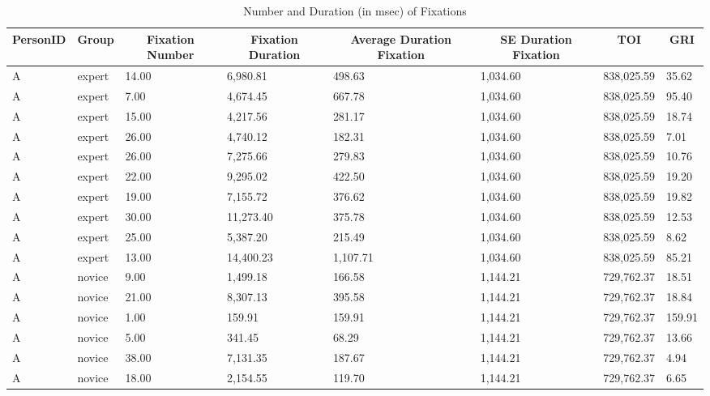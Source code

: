 \documentclass[
  english,
  man,floatsintext]{apa6}
\begin{document}
\begin{table}[h]

\begin{center}
\begin{threeparttable}

\caption{\label{tab:GRItable}Number and Duration (in msec) of Fixations}

\small{

\begin{tabular}{llllllll}
\toprule
PersonID & \multicolumn{1}{c}{Group} & \multicolumn{1}{c}{Fixation Number} & \multicolumn{1}{c}{Fixation Duration} & \multicolumn{1}{c}{Average Duration Fixation} & \multicolumn{1}{c}{SE Duration Fixation} & \multicolumn{1}{c}{TOI} & \multicolumn{1}{c}{GRI}\\
\midrule
A & expert & 14.00 & 6,980.81 & 498.63 & 1,034.60 & 838,025.59 & 35.62\\
A & expert & 7.00 & 4,674.45 & 667.78 & 1,034.60 & 838,025.59 & 95.40\\
A & expert & 15.00 & 4,217.56 & 281.17 & 1,034.60 & 838,025.59 & 18.74\\
A & expert & 26.00 & 4,740.12 & 182.31 & 1,034.60 & 838,025.59 & 7.01\\
A & expert & 26.00 & 7,275.66 & 279.83 & 1,034.60 & 838,025.59 & 10.76\\
A & expert & 22.00 & 9,295.02 & 422.50 & 1,034.60 & 838,025.59 & 19.20\\
A & expert & 19.00 & 7,155.72 & 376.62 & 1,034.60 & 838,025.59 & 19.82\\
A & expert & 30.00 & 11,273.40 & 375.78 & 1,034.60 & 838,025.59 & 12.53\\
A & expert & 25.00 & 5,387.20 & 215.49 & 1,034.60 & 838,025.59 & 8.62\\
A & expert & 13.00 & 14,400.23 & 1,107.71 & 1,034.60 & 838,025.59 & 85.21\\
A & novice & 9.00 & 1,499.18 & 166.58 & 1,144.21 & 729,762.37 & 18.51\\
A & novice & 21.00 & 8,307.13 & 395.58 & 1,144.21 & 729,762.37 & 18.84\\
A & novice & 1.00 & 159.91 & 159.91 & 1,144.21 & 729,762.37 & 159.91\\
A & novice & 5.00 & 341.45 & 68.29 & 1,144.21 & 729,762.37 & 13.66\\
A & novice & 38.00 & 7,131.35 & 187.67 & 1,144.21 & 729,762.37 & 4.94\\
A & novice & 18.00 & 2,154.55 & 119.70 & 1,144.21 & 729,762.37 & 6.65\\

\end{tabular}}
\end{threeparttable}
\end{center}
\end{table}
\end{document}
